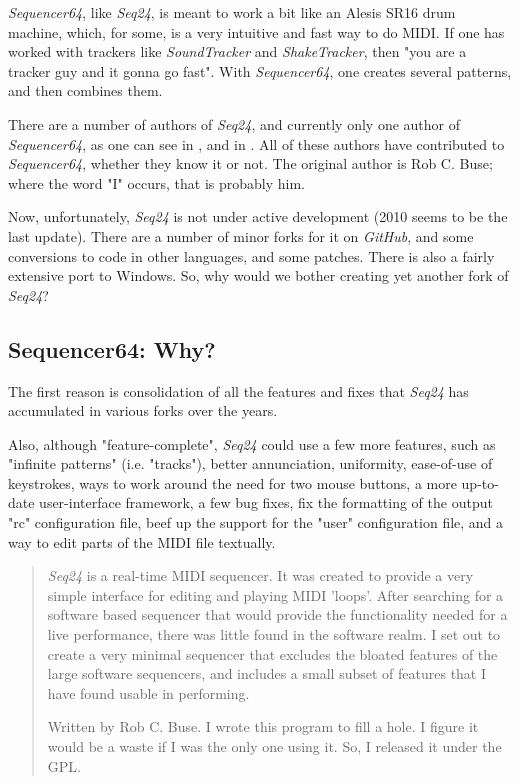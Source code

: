 \documentclass[
 11pt,
 twoside,
 a4paper,
 headinclude,
 footinclude,
 final                                 %
]{article}
\begin{document}
   \textsl{Sequencer64}, like \textsl{Seq24},
   is meant to work a bit like an Alesis SR16 drum machine,
   which, for some, is a very intuitive and fast way to do MIDI.
   If one has worked with trackers like \textsl{SoundTracker} and
   \textsl{ShakeTracker}, then "you are a tracker guy and it gonna go fast".
   With \textsl{Sequencer64}, one creates several patterns, and then
   combines them.

   There are a number of authors of \textsl{Seq24}, and currently only
   one author of \textsl{Sequencer64},
   as one can see in ,
   and in .
   All of these authors have contributed to \textsl{Sequencer64}, whether
   they know it or not.
   The original author is Rob C. Buse; where the word "I" occurs, that is
   probably him.

   Now, unfortunately, \textsl{Seq24} is not under active
   development (2010 seems to be the last update).  There are a number of
   minor forks for it on \textsl{GitHub}, and some conversions
   to code in other languages, and some patches.
   There is also a fairly extensive port to Windows.
   So, why would we bother creating yet another fork of \textsl{Seq24}?

\subsection{Sequencer64: Why?}
\label{subsec:introduction_seq64_vs_others}

   The first reason is consolidation of all the features and fixes that
   \textsl{Seq24} has accumulated in various forks over the years.

   Also, although "feature-complete", \textsl{Seq24} could use a few more
   features, such as "infinite patterns" (i.e. "tracks"), better annunciation,
   uniformity, ease-of-use of keystrokes, ways to work around the need for
   two mouse buttons, a more up-to-date user-interface framework, a few bug
   fixes, fix the formatting of the output "rc" configuration file, beef up the
   support for the "user" configuration file, and a way to edit parts of the
   MIDI file textually.

   \begin{quotation}
      \textsl{Seq24} is a real-time MIDI sequencer. It was created to
      provide a very simple interface for editing and playing MIDI 'loops'.
      After searching for a software based sequencer that would provide the
      functionality needed for a live performance, there was little found in
      the software realm. I set out to create a very minimal sequencer that
      excludes the bloated features of the large software sequencers, and
      includes a small subset of features that I have found usable in
      performing. 

      Written by Rob C. Buse.  I wrote this program to fill a
      hole.  I figure it would be a waste if I was the only one
      using it.  So, I released it under the GPL.
   \end{quotation}
\end{document}
